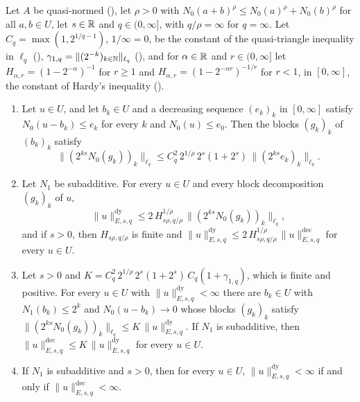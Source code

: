 \begin{theorem}
\label{thm:e-block-decomposition}
\leanok
{}
Let $A$ be quasi-normed (), let $\rho > 0$ with
$N_0(a + b)^\rho \leq N_0(a)^\rho + N_0(b)^\rho$ for all $a, b \in U$, let $s \in \mathbb{R}$ and
$q \in (0, \infty]$, with $q/\rho = \infty$ for $q = \infty$. Let $C_q = \max(1, 2^{1/q - 1})$,
$1/\infty = 0$, be the constant of the quasi-triangle inequality in $\ell_q$
(), $\gamma_{1,q} = \|(2^{-k})_{k \in \mathbb{N}}\|_{\ell_q}$
(), and for $\alpha \in \mathbb{R}$ and $r \in (0, \infty]$ let
$H_{\alpha, r} = (1 - 2^{-\alpha})^{-1}$ for $r \geq 1$ and
$H_{\alpha, r} = (1 - 2^{-\alpha r})^{-1/r}$ for $r < 1$, in $[0, \infty]$, the constant of
Hardy's inequality ().
\begin{enumerate}
  \item Let $u \in U$, and let $b_k \in U$ and a decreasing sequence $(e_k)_k$ in $[0, \infty]$
    satisfy $N_0(u - b_k) \leq e_k$ for every $k$ and $N_0(u) \leq e_0$. Then the blocks
    $(g_k)_k$ of $(b_k)_k$ satisfy
    \[
      \|(2^{ks} N_0(g_k))_k\|_{\ell_q} \leq C_q^2 \, 2^{1/\rho} \, 2^s (1 + 2^s) \,
      \|(2^{ks} e_k)_k\|_{\ell_q} .
    \]
  \item Let $N_1$ be subadditive. For every $u \in U$ and every block decomposition $(g_k)_k$
    of $u$,
    \[
      \|u\|^{\mathrm{dy}}_{E, s, q} \leq 2 \, H_{s\rho, q/\rho}^{1/\rho} \,
      \|(2^{ks} N_0(g_k))_k\|_{\ell_q} ,
    \]
    and if $s > 0$, then $H_{s\rho, q/\rho}$ is finite and
    $\|u\|^{\mathrm{dy}}_{E, s, q} \leq 2 \, H_{s\rho, q/\rho}^{1/\rho} \,
    \|u\|^{\mathrm{dec}}_{E, s, q}$ for every $u \in U$.
  \item Let $s > 0$ and $K = C_q^2 \, 2^{1/\rho} \, 2^s (1 + 2^s) \, C_q (1 + \gamma_{1,q})$,
    which is finite and positive. For every $u \in U$ with
    $\|u\|^{\mathrm{dy}}_{E, s, q} < \infty$ there are $b_k \in U$ with $N_1(b_k) \leq 2^k$ and
    $N_0(u - b_k) \to 0$ whose blocks $(g_k)_k$ satisfy
    $\|(2^{ks} N_0(g_k))_k\|_{\ell_q} \leq K \, \|u\|^{\mathrm{dy}}_{E, s, q}$. If $N_1$ is
    subadditive, then
    $\|u\|^{\mathrm{dec}}_{E, s, q} \leq K \, \|u\|^{\mathrm{dy}}_{E, s, q}$ for every $u \in U$.
  \item If $N_1$ is subadditive and $s > 0$, then for every $u \in U$,
    $\|u\|^{\mathrm{dy}}_{E, s, q} < \infty$ if and only if
    $\|u\|^{\mathrm{dec}}_{E, s, q} < \infty$.
\end{enumerate}
\end{theorem}

